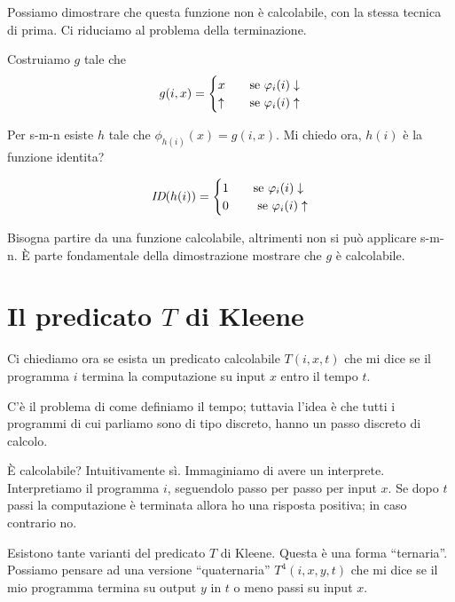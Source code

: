 Possiamo dimostrare che questa funzione non è calcolabile, con la stessa tecnica di prima. Ci
riduciamo al problema della terminazione.

Costruiamo $g$ tale che
\begin{equation*}
    g(i,x) =
    \begin{cases}
        x \quad & \text{se $\varphi_{i}(i) \downarrow$} \\
        \uparrow \quad & \text{se $\varphi_{i}(i) \uparrow$}
    \end{cases}
\end{equation*}

Per s-m-n esiste $h$ tale che $\phi_{h(i)}(x) = g(i,x)$. Mi chiedo ora, $h(i)$ è la funzione
identita?

\begin{equation*}
    \textit{ID}(h(i)) =
    \begin{cases}
        1 \quad &\text{se $\varphi_{i}(i) \downarrow$} \\ 
        0 \quad &\text{ se $\varphi_{i}(i) \uparrow$} \\
    \end{cases}
\end{equation*}

Bisogna partire da una funzione calcolabile, altrimenti non si può applicare s-m-n. È parte
fondamentale della dimostrazione mostrare che $g$ è calcolabile.

\section{Il predicato $T$ di Kleene}

Ci chiediamo ora se esista un predicato calcolabile $T(i,x,t)$ che mi dice se il programma $i$
termina la computazione su input $x$ entro il tempo $t$.

C'è il problema di come definiamo il tempo; tuttavia l'idea è che tutti i programmi di cui
parliamo sono di tipo discreto, hanno un passo discreto di calcolo.

È calcolabile? Intuitivamente sì. Immaginiamo di avere un interprete. Interpretiamo il programma
$i$, seguendolo passo per passo per input $x$. Se dopo $t$ passi la computazione è terminata allora
ho una risposta positiva; in caso contrario no.

Esistono tante varianti del predicato $T$ di Kleene. Questa è una forma ``ternaria''. Possiamo pensare
ad una versione ``quaternaria'' $T^{4}(i,x,y,t)$ che mi dice se il mio programma termina su output
$y$ in $t$ o meno passi su input $x$.

